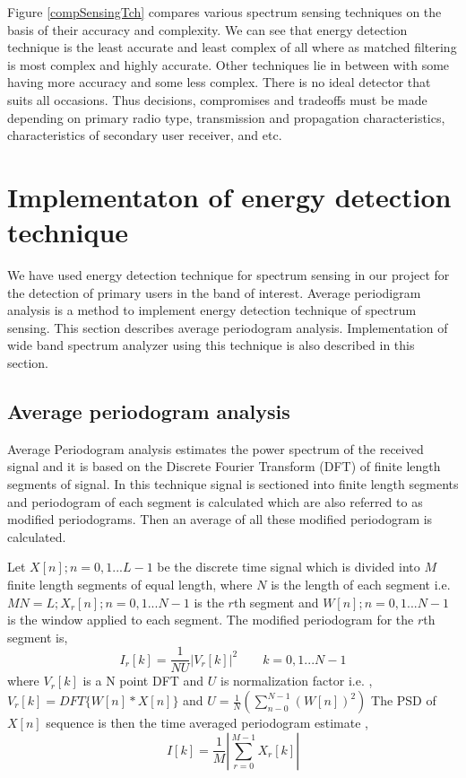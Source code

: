 Figure \ref{compSensingTch} compares various spectrum sensing techniques on the basis of their 
accuracy and complexity. We can see that energy detection technique is the least
accurate and least complex of all where as matched filtering is most complex and
highly accurate. Other techniques lie in between with some having more accuracy 
and some less complex. There is no ideal detector that suits all occasions. Thus
decisions, compromises and tradeoffs must be made depending on primary radio 
type, transmission and propagation characteristics, characteristics of secondary
user receiver, and etc\cite{akyildiz06}.

\section{Implementaton of energy detection technique}
We have used energy detection technique for spectrum sensing in our project for 
the detection of primary users in the band of interest. Average periodigram 
analysis is a method to implement energy detection technique of spectrum 
sensing. This section describes average periodogram analysis.  Implementation of
wide band spectrum analyzer using this technique is also described in this 
section.

\subsection{Average periodogram analysis}
Average Periodogram analysis estimates the power spectrum of the received signal
and it is based on the Discrete Fourier Transform (DFT) of finite length 
segments of signal. In this technique signal is sectioned into finite length 
segments and periodogram of each segment is calculated which are also referred 
to as modified periodograms. Then an average of all these modified periodogram 
is calculated\cite{welch67}.

Let $X[n]; n = 0,1...L-1$ be the discrete time signal which is  divided into 
$M$ 
finite length segments of equal length, where $N$ is the length of each segment  
i.e. $ MN = L; X_{r}[n]; n = 0,1...N-1 $ is the $r$th segment and $ W[n]; n = 0,1...N-1 $ is 
the window applied to each segment. The modified periodogram for the $r$th segment
 is,
\begin{equation*}
    I_{r}[k] = \frac{1}{NU} \left| V_{r}[k]\right|^2     \qquad k = 0,1...N-1 
\end{equation*}
where $V_{r}[k]$ is a N point DFT and $U$ is normalization factor i.e. , 
$V_{r}[k] = DFT\{W[n]*X[n]\}$
and $U = \frac{1}{N}(\sum_{n-0}^{N-1} (W[n])^2)$
The PSD of $X[n]$ sequence is then the time averaged periodogram estimate ,
\begin{equation*}
    I[k] = \frac{1}{M}\left|\sum_{r=0}^{M-1}X_{r}[k]\right|
\end{equation*}

